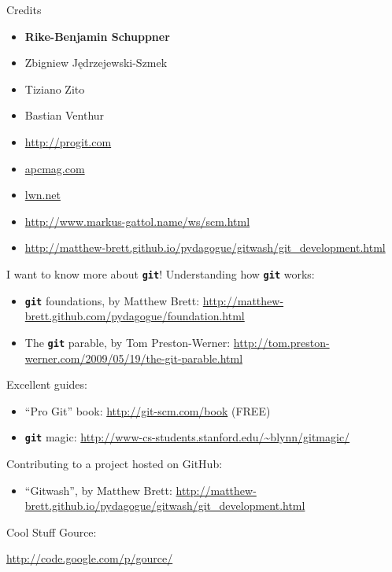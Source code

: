\documentclass{beamer}
\newcommand{\git}{\texttt{\textbf{git}}\xspace}
\begin{document}
\begin{frame}{Credits}
  \begin{itemize}
  \item \textbf{Rike-Benjamin Schuppner}
  \item Zbigniew J\k{e}drzejewski-Szmek
  \item Tiziano Zito
  \item Bastian Venthur
  \item \url{http://progit.com}
  \item \url{apcmag.com}
  \item \url{lwn.net}
  \item \url{http://www.markus-gattol.name/ws/scm.html}
  \item \url{http://matthew-brett.github.io/pydagogue/gitwash/git_development.html}
  \end{itemize}
\end{frame}

\begin{frame}{I want to know more about \git!}
  Understanding how \git works:
  \begin{itemize}
  \item \git foundations, by Matthew Brett:
    \small
    \url{http://matthew-brett.github.com/pydagogue/foundation.html}
  \item  The \git parable, by Tom Preston-Werner:
    \small
  \url{http://tom.preston-werner.com/2009/05/19/the-git-parable.html}
  \end{itemize}
  Excellent guides:
  \begin{itemize}
  \item ``Pro Git'' book: \url{http://git-scm.com/book} (FREE)
  \item \git magic: \url{http://www-cs-students.stanford.edu/~blynn/gitmagic/}
  \end{itemize}
  Contributing to a project hosted on GitHub:
  \begin{itemize}
  \item ``Gitwash'', by Matthew Brett:
    \small
    \url{http://matthew-brett.github.io/pydagogue/gitwash/git_development.html}
  \end{itemize}
\end{frame}

\begin{frame}{Cool Stuff}
Gource:
  \begin{center}
    \url{http://code.google.com/p/gource/}
  \end{center}
\end{frame}
\end{document}

